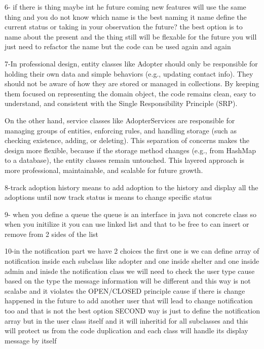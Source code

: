 6- if there is thing maybe int he future coming new features will use the same thing and you do not know which name is the best
naming it name define the current status or taking in your observation the future?
the best option is to name about the present and the thing still will be flexable for the future you will just need to refactor the name 
but the code can be used again and again 

7-In professional design, entity classes like Adopter should only be responsible for holding their own data and simple behaviors (e.g., updating contact info).
They should not be aware of how they are stored or managed in collections.
By keeping them focused on representing the domain object, the code remains clean, easy to understand, and consistent with the Single Responsibility Principle (SRP).

On the other hand, service classes like AdopterServices are responsible for managing groups of entities, enforcing rules, and handling storage (such as checking existence, adding, or deleting). 
This separation of concerns makes the design more flexible, because if the storage method changes (e.g., from HashMap to a database), the entity classes remain untouched. 
This layered approach is more professional, maintainable, and scalable for future growth.

8-track adoption history means to add adoption to the history and display all the adoptions until now 
track status is means to change specific status 

9- when you define a queue the queue is an interface in java not concrete class so when you initilize it you can use linked list and that to 
be free to can insert or remove from 2 sides of the list 

10-in the notification part we have 2 choices the first one is we can define array of notification inside each subclass like adopter and one inside shelter
and one inside admin and inisde the notification class we will need to check the user type cause based on the type the message information will be different
and this way is not scalabe and it violates the OPEN/CLOSED principle cause if there is change happened in the future to add another user 
that will lead to change notification too and that is not the best option 
SECOND way is just to define the notification array but in the user class itself and it will inheritid for all subclasses and this will protect us from the code duplication
and each class will handle its display message by itself 

